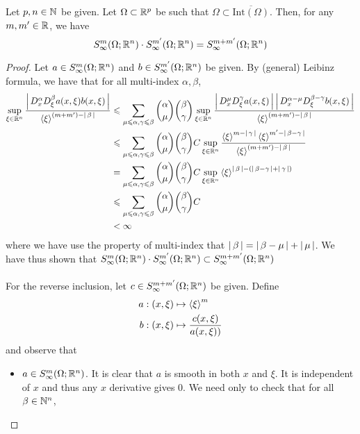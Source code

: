 \documentclass{article}
\begin{document}
\begin{fprop}
    Let $p, n \in \N$ be given. Let $\Omega \subset \R^p$ be such that $\Omega \subset \overline{\mathrm{Int}(\Omega)}$. Then, for any $m, m' \in \R$, we have 
    \[
    S^{m}_\infty(\Omega; \R^n) \cdot S^{m'}_\infty(\Omega; \R^n) = S^{m + m'}_\infty(\Omega; \R^n)
    \]
\end{fprop}
\begin{proof}
    Let $a \in S^{m}_\infty(\Omega; \R^n)$ and $b \in S^{m'}_\infty(\Omega; \R^n)$ be given. By (general) Leibinz formula, we have that for all multi-index $\alpha, \beta$, 
    \begin{align*}
    \sup_{\xi \in \R^n} \frac{\abs{D^\alpha_x D^\beta_\xi a(x, \xi)b(x, \xi)}}{\sym[\xi]^{(m + m') - \abs{\beta}}} 
    &\leq  \sum_{\mu \leq \alpha, \gamma \leq \beta} \binom{\alpha}{\mu} \binom{\beta}{\gamma} \sup_{\xi \in \R^n} \frac{\abs{D^\mu_x D^\gamma_\xi a(x, \xi)} \abs{D^{\alpha - \mu}_x D^{\beta - \gamma}_\xi b(x, \xi)}}{\sym[\xi]^{(m + m') - \abs{\beta}}} \\
    &\leq \sum_{\mu \leq \alpha, \gamma \leq \beta} \binom{\alpha}{\mu} \binom{\beta}{\gamma} C \sup_{\xi \in \R^n} \frac{\sym[\xi]^{m - \abs{\gamma}} \sym[\xi]^{m' - \abs{\beta - \gamma}}}{\sym[\xi]^{(m + m') - \abs{\beta}}} \\
    &= \sum_{\mu \leq \alpha, \gamma \leq \beta} \binom{\alpha}{\mu} \binom{\beta}{\gamma} C \sup_{\xi \in \R^n} \sym[\xi]^{\abs{\beta} - (\abs{\beta - \gamma} + \abs{\gamma})} \\
    & \leq \sum_{\mu \leq \alpha, \gamma \leq \beta} \binom{\alpha}{\mu} \binom{\beta}{\gamma} C \\
    &< \infty
    \end{align*}
    where we have use the property of multi-index that $\abs{\beta} = \abs{\beta - \mu} + \abs{\mu}$.  We have thus shown that $S^{m}_\infty(\Omega; \R^n) \cdot S^{m'}_\infty(\Omega; \R^n) \subset S^{m + m'}_\infty(\Omega; \R^n)$\\
    \\
    For the reverse inclusion, let $c \in S^{m + m'}_\infty(\Omega; \R^n)$ be given. Define 
    \begin{align*}
    a : (x, \xi) &\mapsto \sym[\xi]^m\\
    b: (x, \xi) &\mapsto \frac{c(x, \xi)}{a(x, \xi))}
    \end{align*}
    and observe that 
    \begin{itemize}
        \item $a \in S^{m}_\infty(\Omega; \R^n)$. It is clear that $a$ is smooth in both $x$ and $\xi$. It is independent of $x$ and thus any $x$ derivative gives 0. We need only to check that for all $\beta \in \N^n$, 

\end{itemize}
\end{proof}
\end{document}
